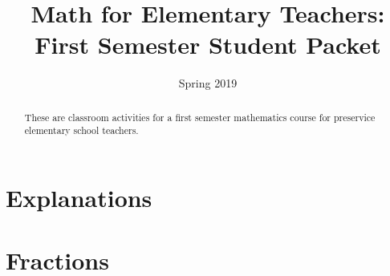 \documentclass[nooutcomes, numbers, handout]{xourse}
\title{Math for Elementary Teachers: First Semester Student Packet}
\author{}
\date{Spring 2019}%
\begin{document}
\begin{abstract}
These are classroom activities for a first semester mathematics course for preservice elementary school teachers.
\end{abstract}
\maketitle


\newpage


\part{Explanations}
\newpage


\part{Fractions}
\newpage
\end{document}
